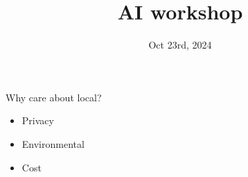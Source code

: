 \documentclass{beamer}
\title{AI workshop}
\date{Oct 23rd, 2024}
\begin{document}
\begin{frame}
	\maketitle
\end{frame}

\begin{frame}
	Why care about local?
\end{frame}

\begin{frame}
	\begin{itemize}
		\item Privacy
		\pause
		\item Environmental
		\pause
		\item Cost
	\end{itemize}
\end{frame}

\begin{frame}[plain]
\end{frame}
\end{document}
